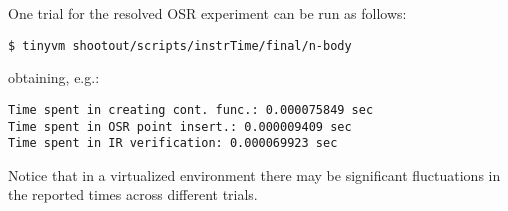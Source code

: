 \noindent One trial for the resolved OSR experiment can be run as follows:
\begin{small}
\begin{verbatim}
$ tinyvm shootout/scripts/instrTime/final/n-body
\end{verbatim}
\end{small}
\noindent obtaining, e.g.:
\begin{small}
\begin{verbatim}
Time spent in creating cont. func.: 0.000075849 sec
Time spent in OSR point insert.: 0.000009409 sec
Time spent in IR verification: 0.000069923 sec
\end{verbatim}
\end{small}

\noindent Notice that in a virtualized environment there may be significant fluctuations in the reported times across different trials.

